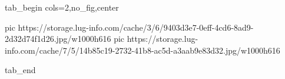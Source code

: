  
 
 
 
 


\ifcmt
  tab_begin cols=2,no_fig,center

     pic https://storage.lug-info.com/cache/3/6/9403d3e7-0eff-4cd6-8ad9-2d32d74f1d26.jpg/w1000h616%
		 pic https://storage.lug-info.com/cache/7/5/14b85c19-2732-41b8-ac5d-a3aab9e83d32.jpg/w1000h616%

  tab_end
\fi
